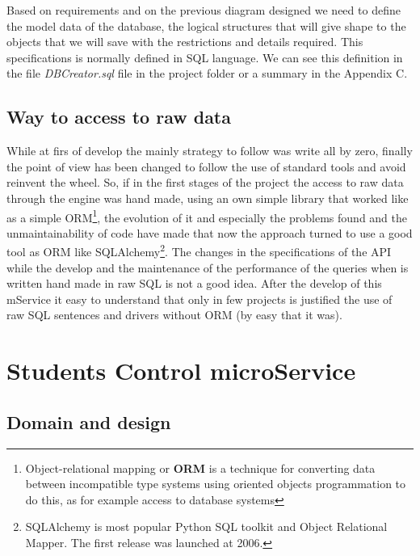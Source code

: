 Based on requirements and on the previous diagram designed we need to define the
model data of the database, the logical structures that will give shape to the
objects that we will save with the restrictions and details required.
This specifications is normally defined in SQL language.
We can see this definition in the file \textit{DBCreator.sql} file in the project
folder or a summary in the Appendix C.

\subsection{Way to access to raw data}

While at firs of develop the mainly strategy to follow was write
all by zero, finally the point of view has been changed to follow
the use of standard tools and avoid reinvent the wheel.
\intro
So, if in the first stages of the project the access to raw data through
the engine was hand made, using an own simple library that worked
like as a simple ORM\footnote{Object-relational mapping or \textbf{ORM} is a
technique for converting data between incompatible
type systems using oriented objects programmation to do this, as for example access
to database systems}, the evolution of it and especially the problems
found and the unmaintainability of code have made that now the approach
turned to use a good tool as ORM like SQLAlchemy\footnote{SQLAlchemy is
most popular Python SQL toolkit and Object Relational Mapper. The first
release was launched at 2006.}.
\intro
The changes in the specifications of the API while the develop and
the maintenance of the performance of the queries when is written hand
made in raw SQL is not a good idea. After the develop of this mService
it easy to understand that only in few projects is justified the use
of raw SQL sentences and drivers without ORM (by easy that it was).


\section{Students Control microService}

\subsection{Domain and design}

